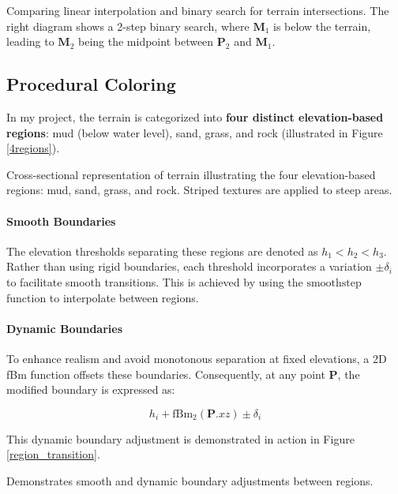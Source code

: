 {Comparing linear interpolation and binary search for terrain intersections. The right diagram shows a 2-step binary search, where $\mathbf{M}_1$ is below the terrain, leading to $\mathbf{M}_2$ being the midpoint between $\mathbf{P}_2$ and $\mathbf{M}_1$. }



\subsection{Procedural Coloring}
\label{Terrain Procedural Texturing}

In my project, the terrain is categorized into \textbf{four distinct elevation-based regions}: mud (below water level), sand, grass, and rock (illustrated in Figure \ref{4regions}).

{Cross-sectional representation of terrain illustrating the four elevation-based regions: mud, sand, grass, and rock. Striped textures are applied to steep areas.}

\paragraph{Smooth Boundaries}
The elevation thresholds separating these regions are denoted as $h_{1} < h_{2} < h_{3}$. Rather than using rigid boundaries, each threshold incorporates a variation $\pm \delta_i$ to facilitate smooth transitions. This is achieved by using the $\text{smoothstep}$ function to interpolate between regions.

\paragraph{Dynamic Boundaries}
To enhance realism and avoid monotonous separation at fixed elevations, a 2D fBm function offsets these boundaries. Consequently, at any point $\mathbf{P}$, the modified boundary is expressed as:

\begin{equation}
    h_{i} + \text{fBm}_{2}(\mathbf{P}.xz) \pm \delta_i
\end{equation}

This dynamic boundary adjustment is demonstrated in action in Figure \ref{region_transition}.

{Demonstrates smooth and dynamic boundary adjustments between regions.}


